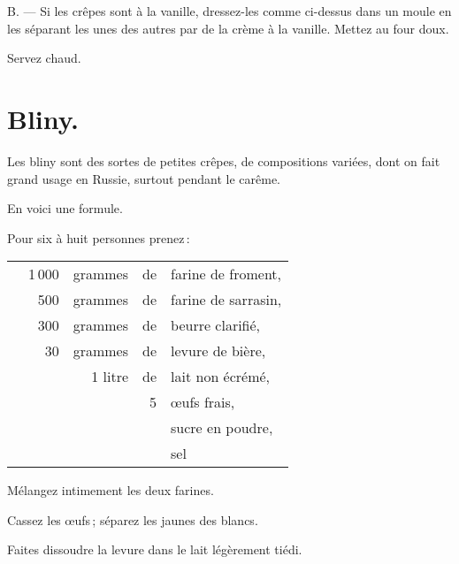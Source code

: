 \medskip

B. — Si les crêpes sont à la vanille, dressez-les comme ci-dessus dans un
moule en les séparant les unes des autres par de la crème à la vanille.
Mettez au four doux.

Servez chaud.

\section*{\centering Bliny.}
{}

Les bliny sont des sortes de petites crêpes, de compositions variées, dont on
fait grand usage en Russie, surtout pendant le carême.

\medskip

En voici une formule.

\medskip

Pour six à huit personnes prenez :

\footnotesize
\begin{longtable}{rrrrp{16em}}
  &    1 000 & grammes & de & farine de froment,                                                          \\
  &      500 & grammes & de & farine de sarrasin,                                                         \\
  &      300 & grammes & de & beurre clarifié,                                                            \\
  &       30 & grammes & de & levure de bière,                                                            \\
  & \multicolumn{2}{r}{1 litre} & de & lait non écrémé,                                                   \\
  &          &         &  5 & œufs frais,                                                                 \\
  &          &         &    & sucre en poudre,                                                            \\
  &          &         &    & sel                                                                         \\
\end{longtable}
\normalsize

Mélangez intimement les deux farines.

Cassez les œufs ; séparez les jaunes des blancs.

Faites dissoudre la levure dans le lait légèrement tiédi.

